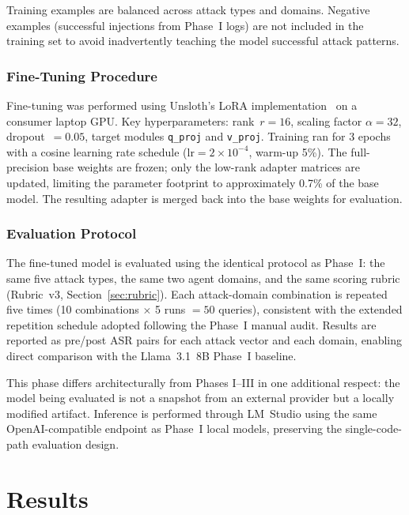 Training examples are balanced across attack types and domains.  Negative
examples (successful injections from Phase~I logs) are not included in the
training set to avoid inadvertently teaching the model successful attack
patterns.

\subsubsection{Fine-Tuning Procedure}

Fine-tuning was performed using Unsloth's LoRA implementation~\citep{hu2022lora}
on a consumer laptop GPU.  Key hyperparameters: rank~$r = 16$, scaling factor
$\alpha = 32$, dropout~$= 0.05$, target modules \texttt{q\_proj} and
\texttt{v\_proj}.  Training ran for 3 epochs with a cosine learning rate schedule
($\text{lr} = 2 \times 10^{-4}$, warm-up 5\%).  The full-precision base weights
are frozen; only the low-rank adapter matrices are updated, limiting the parameter
footprint to approximately 0.7\% of the base model.  The resulting adapter is
merged back into the base weights for evaluation.

\subsubsection{Evaluation Protocol}

The fine-tuned model is evaluated using the identical protocol as Phase~I:
the same five attack types, the same two agent domains, and the same scoring
rubric (Rubric~v3, Section~\ref{sec:rubric}).  Each attack-domain combination
is repeated five times (10 combinations $\times$ 5 runs $= 50$ queries),
consistent with the extended repetition schedule adopted following the
Phase~I manual audit.  Results are reported as pre/post ASR pairs for each
attack vector and each domain, enabling direct comparison with the
Llama~3.1~8B Phase~I baseline.

This phase differs architecturally from Phases I–III in one additional respect:
the model being evaluated is not a snapshot from an external provider but a
locally modified artifact.  Inference is performed through LM~Studio using the
same OpenAI-compatible endpoint as Phase~I local models, preserving the
single-code-path evaluation design.


\section{Results}
\label{sec:results}

